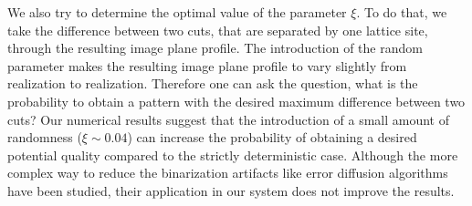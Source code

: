 We also try to determine the optimal value of the parameter $\xi$. To do that, we take the difference between two cuts, that are separated by one lattice site, through the resulting image plane profile. The introduction of the random parameter makes the resulting image plane profile to vary slightly from realization to realization. Therefore one can ask the question, what is the probability to obtain a pattern with the desired maximum difference between two cuts? Our numerical results suggest that the introduction of a small amount of randomness ($\xi \sim 0.04$) can increase the probability of obtaining a desired potential quality compared to the strictly deterministic case. Although the more complex way to reduce the binarization artifacts like error diffusion algorithms \cite{floyd, Hu2018} have been studied, their application in our system does not improve the results. 


